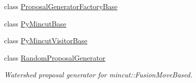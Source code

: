 \begin{DoxyCompactItemize}
class \hyperlink{classnifty_1_1graph_1_1opt_1_1mincut_1_1ProposalGeneratorFactoryBase}{Proposal\+Generator\+Factory\+Base}
\item 
class \hyperlink{classnifty_1_1graph_1_1opt_1_1mincut_1_1PyMincutBase}{Py\+Mincut\+Base}
\item 
class \hyperlink{classnifty_1_1graph_1_1opt_1_1mincut_1_1PyMincutVisitorBase}{Py\+Mincut\+Visitor\+Base}
\item 
class \hyperlink{classnifty_1_1graph_1_1opt_1_1mincut_1_1RandomProposalGenerator}{Random\+Proposal\+Generator}
\begin{DoxyCompactList}\small\item\em Watershed proposal generator for mincut\+::\+Fusion\+Move\+Based. \end{DoxyCompactList}\end{DoxyCompactItemize}
